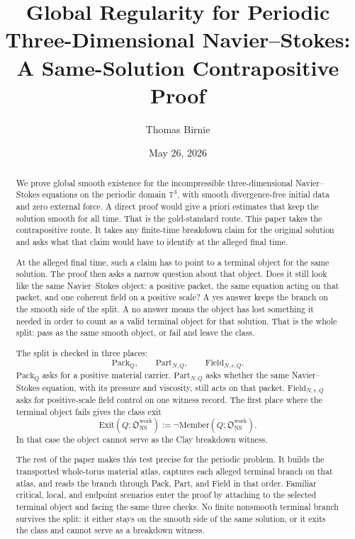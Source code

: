 \documentclass[11pt]{article}
\title{Global Regularity for Periodic Three-Dimensional Navier--Stokes: A Same-Solution Contrapositive Proof}
\author{Thomas Birnie}
\date{May 26, 2026}
\newcommand{\NS}{\mathrm{NS}}
\newcommand{\Pack}{\mathrm{Pack}}
\newcommand{\Part}{\mathrm{Part}}
\newcommand{\Field}{\mathrm{Field}}
\newcommand{\Member}{\mathrm{Member}}
\newcommand{\Exit}{\mathrm{Exit}}
\newcommand{\Owork}{\mathfrak O_{\NS}^{\mathrm{work}}}
\begin{document}
\maketitle

\begin{abstract}
We prove global smooth existence for the incompressible three-dimensional Navier--Stokes equations on the periodic domain \(\mathbb T^3\), with smooth divergence-free initial data and zero external force.
A direct proof would give a priori estimates that keep the solution smooth for all time.
That is the gold-standard route.
This paper takes the contrapositive route.
It takes any finite-time breakdown claim for the original solution and asks what that claim would have to identify at the alleged final time.

At the alleged final time, such a claim has to point to a terminal object for the same solution.
The proof then asks a narrow question about that object.
Does it still look like the same Navier--Stokes object: a positive packet, the same equation acting on that packet, and one coherent field on a positive scale?
A yes answer keeps the branch on the smooth side of the split.
A no answer means the object has lost something it needed in order to count as a valid terminal object for that solution.
That is the whole split: pass as the same smooth object, or fail and leave the class.

The split is checked in three places:
\[
  \Pack_Q,\qquad \Part_{N,Q},\qquad \Field_{N,r,Q}.
\]
\(\Pack_Q\) asks for a positive material carrier.
\(\Part_{N,Q}\) asks whether the same Navier--Stokes equation, with its pressure and viscosity, still acts on that packet.
\(\Field_{N,r,Q}\) asks for positive-scale field control on one witness record.
The first place where the terminal object fails gives the class exit
\[
  \Exit(Q;\Owork):=\neg\Member(Q;\Owork).
\]
In that case the object cannot serve as the Clay breakdown witness.

The rest of the paper makes this test precise for the periodic problem.
It builds the transported whole-torus material atlas, captures each alleged terminal branch on that atlas, and reads the branch through Pack, Part, and Field in that order.
Familiar critical, local, and endpoint scenarios enter the proof by attaching to the selected terminal object and facing the same three checks.
No finite nonsmooth terminal branch survives the split: it either stays on the smooth side of the same solution, or it exits the class and cannot serve as a breakdown witness.
\end{abstract}
\end{document}
